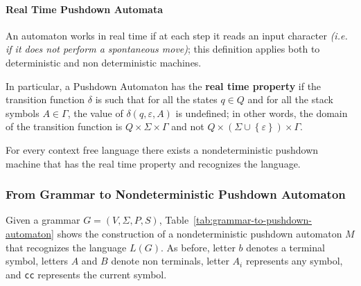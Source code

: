 \documentclass[english]{article}
\begin{document}
\paragraph{Real Time Pushdown Automata}

An automaton works in real time if at each step it reads an input character \textit{(i.e. if it does not perform a spontaneous move)};
this definition applies both to deterministic and non deterministic machines.

In particular, a Pushdown Automaton has the \textbf{real time property} if the transition function \(\delta\) is such that for all the states \(q \in Q\) and for all the stack symbols \(A \in \Gamma\), the value of \(\delta(q, \varepsilon, A)\) is undefined;
in other words, the domain of the transition function is \(Q \times \Sigma \times \Gamma\) and not \(Q \times \left( \Sigma \cup \left\{ \varepsilon \right\} \right) \times \Gamma\).

For every context free language there exists a nondeterministic pushdown machine that has the real time property and recognizes the language.

\subsubsection{From Grammar to Nondeterministic Pushdown Automaton}

Given a grammar \(G = \left( V, \Sigma, P, S \right)\), Table~\ref{tab:grammar-to-pushdown-automaton} shows the construction of a nondeterministic pushdown automaton \(M\) that recognizes the language \(L(G)\).
As before, letter \(b\) denotes a terminal symbol, letters \(A\) and \(B\) denote non terminals, letter \(A_i\) represents any symbol, and \texttt{cc} represents the current symbol.
\end{document}
